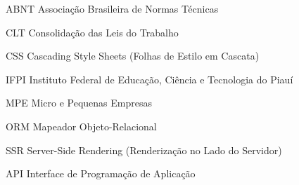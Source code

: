 \begin{siglas}
  \item[ABNT] Associação Brasileira de Normas Técnicas
  \item[CLT] Consolidação das Leis do Trabalho
  \item[CSS] Cascading Style Sheets (Folhas de Estilo em Cascata)
  \item[IFPI] Instituto Federal de Educação, Ciência e Tecnologia do Piauí
  \item[MPE] Micro e Pequenas Empresas
  \item[ORM] Mapeador Objeto-Relacional
  \item[SSR] Server-Side Rendering (Renderização no Lado do Servidor)
  \item[API] Interface de Programação de Aplicação
\end{siglas}
